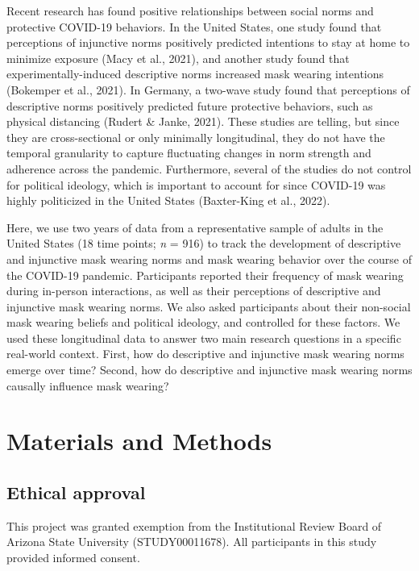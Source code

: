 \documentclass[
  man, donotrepeattitle,mask,floatsintext]{apa6}
\begin{document}
Recent research has found positive relationships between social norms and protective COVID-19 behaviors. In the United States, one study found that perceptions of injunctive norms positively predicted intentions to stay at home to minimize exposure (Macy et al., 2021), and another study found that experimentally-induced descriptive norms increased mask wearing intentions (Bokemper et al., 2021). In Germany, a two-wave study found that perceptions of descriptive norms positively predicted future protective behaviors, such as physical distancing (Rudert \& Janke, 2021). These studies are telling, but since they are cross-sectional or only minimally longitudinal, they do not have the temporal granularity to capture fluctuating changes in norm strength and adherence across the pandemic. Furthermore, several of the studies do not control for political ideology, which is important to account for since COVID-19 was highly politicized in the United States (Baxter-King et al., 2022).

Here, we use two years of data from a representative sample of adults in the United States (18 time points; \emph{n} = 916) to track the development of descriptive and injunctive mask wearing norms and mask wearing behavior over the course of the COVID-19 pandemic. Participants reported their frequency of mask wearing during in-person interactions, as well as their perceptions of descriptive and injunctive mask wearing norms. We also asked participants about their non-social mask wearing beliefs and political ideology, and controlled for these factors. We used these longitudinal data to answer two main research questions in a specific real-world context. First, how do descriptive and injunctive mask wearing norms emerge over time? Second, how do descriptive and injunctive mask wearing norms causally influence mask wearing?

\hypertarget{materials-and-methods}{%
\section{Materials and Methods}\label{materials-and-methods}}

\hypertarget{ethical-approval}{%
\subsection{Ethical approval}\label{ethical-approval}}

This project was granted exemption from the Institutional Review Board of Arizona State University (STUDY00011678). All participants in this study provided informed consent.
\end{document}

